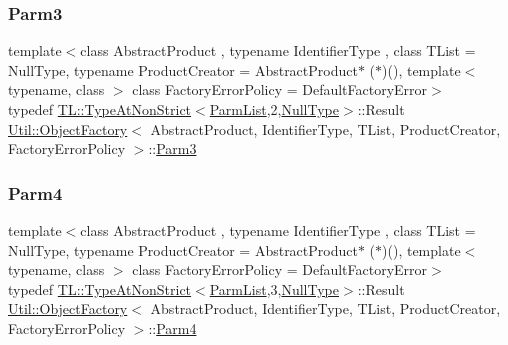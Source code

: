 \subsubsection{\texorpdfstring{Parm3}{Parm3}\hspace{0.1cm}{\footnotesize\ttfamily [2/2]}}
{\footnotesize\ttfamily template$<$class Abstract\+Product , typename Identifier\+Type , class T\+List  = Null\+Type, typename Product\+Creator  = Abstract\+Product$\ast$ ($\ast$)(), template$<$ typename, class $>$ class Factory\+Error\+Policy = Default\+Factory\+Error$>$ \\
typedef \mbox{\hyperlink{structUtil_1_1TL_1_1TypeAtNonStrict}{T\+L\+::\+Type\+At\+Non\+Strict}}$<$\mbox{\hyperlink{classUtil_1_1ObjectFactory_a46f003a5928e8a60140e0a74ac261c36}{Parm\+List}},2,\mbox{\hyperlink{classUtil_1_1NullType}{Null\+Type}}$>$\+::Result \mbox{\hyperlink{classUtil_1_1ObjectFactory}{Util\+::\+Object\+Factory}}$<$ Abstract\+Product, Identifier\+Type, T\+List, Product\+Creator, Factory\+Error\+Policy $>$\+::\mbox{\hyperlink{classUtil_1_1ObjectFactory_ae5c679dd2f210e0a5ad257b336f754fb}{Parm3}}}

\mbox{\label{classUtil_1_1ObjectFactory_a052f09d9e81b11d98bb53a52f327cf01}} 
\subsubsection{\texorpdfstring{Parm4}{Parm4}\hspace{0.1cm}{\footnotesize\ttfamily [1/2]}}
{\footnotesize\ttfamily template$<$class Abstract\+Product , typename Identifier\+Type , class T\+List  = Null\+Type, typename Product\+Creator  = Abstract\+Product$\ast$ ($\ast$)(), template$<$ typename, class $>$ class Factory\+Error\+Policy = Default\+Factory\+Error$>$ \\
typedef \mbox{\hyperlink{structUtil_1_1TL_1_1TypeAtNonStrict}{T\+L\+::\+Type\+At\+Non\+Strict}}$<$\mbox{\hyperlink{classUtil_1_1ObjectFactory_a46f003a5928e8a60140e0a74ac261c36}{Parm\+List}},3,\mbox{\hyperlink{classUtil_1_1NullType}{Null\+Type}}$>$\+::Result \mbox{\hyperlink{classUtil_1_1ObjectFactory}{Util\+::\+Object\+Factory}}$<$ Abstract\+Product, Identifier\+Type, T\+List, Product\+Creator, Factory\+Error\+Policy $>$\+::\mbox{\hyperlink{classUtil_1_1ObjectFactory_a052f09d9e81b11d98bb53a52f327cf01}{Parm4}}}


